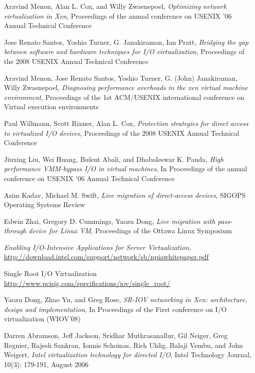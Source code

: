\begin{thebibliography}{99}
 Aravind Menon, Alan L. Cox, and Willy Zwaenepoel,
  \emph{Optimizing network virtualization in Xen}, Proceedings of the
  annual conference on USENIX '06 Annual Technical Conference

 Jose Renato Santos, Yoshio Turner,
  G. Janakiraman, Ian Pratt, \emph{Bridging the gap between software
    and hardware techniques for I/O virtualization}, Proceedings of
  the 2008 USENIX Annual Technical Conference

 Aravind Menon, Jose Renato Santos, Yoshio Turner,
  G. (John) Janakiraman, Willy Zwaenepoel, \emph{Diagnosing
    performance overheads in the xen virtual machine environment},
  Proceedings of the 1st ACM/USENIX international conference on
  Virtual execution environments

 Paul Willmann, Scott Rixner, Alan L. Cox,
  \emph{Protection strategies for direct access to virtualized I/O
    devices}, Proceedings of the 2008 USENIX Annual Technical
  Conference

 Jiuxing Liu, Wei Huang, Bulent Abali, and
  Dhabaleswar K. Panda, \emph{High performance VMM-bypass I/O in
    virtual machines}, In Proceedings of the annual conference on
  USENIX '06 Annual Technical Conference

 Asim Kadav, Michael M. Swift, \emph{Live
    migration of direct-access devices}, SIGOPS Operating Systems
  Review

 Edwin Zhai, Gregory D. Cummings, Yaozu Dong,
  \emph{Live migration with pass-through device for Linux VM},
  Proceedings of the Ottawa Linux Symposium

 \emph{Enabling I/O-Intensive Applications for
    Server Virtualization},
  \url{http://download.intel.com/support/network/sb/npiawhitepaper.pdf}

 Single Root I/O Virtualization
  \url{http://www.pcisig.com/specifications/iov/single_root/}

 Yaozu Dong, Zhao Yu, and Greg Rose, \emph{SR-IOV
    networking in Xen: architecture, design and implementation}, In
  Proceedings of the First conference on I/O virtualization (WIOV'08)

 Darren Abramson, Jeff Jackson, Sridhar Muthrasanallur,
  Gil Neiger, Greg Regnier, Rajesh Sankran, Ionnis Schoinas, Rich
  Uhlig, Balaji Vembu, and John Weigert, \emph{Intel virtualization
    technology for directed I/O}, Intel Technology Journal, 10(3):
  179-191, August 2006


\end{thebibliography}

